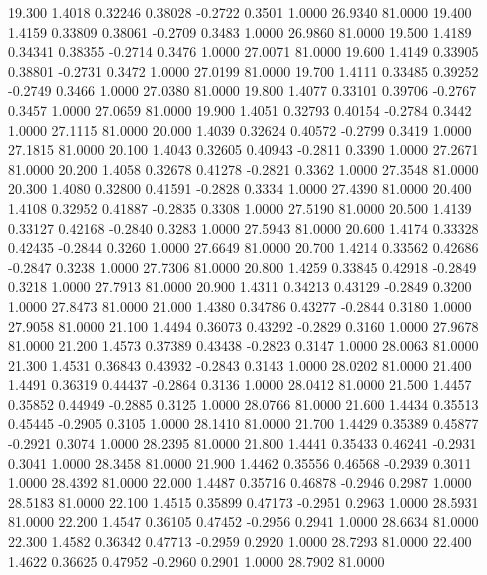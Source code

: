   19.300   1.4018   0.32246   0.38028  -0.2722   0.3501   1.0000  26.9340  81.0000
  19.400   1.4159   0.33809   0.38061  -0.2709   0.3483   1.0000  26.9860  81.0000
  19.500   1.4189   0.34341   0.38355  -0.2714   0.3476   1.0000  27.0071  81.0000
  19.600   1.4149   0.33905   0.38801  -0.2731   0.3472   1.0000  27.0199  81.0000
  19.700   1.4111   0.33485   0.39252  -0.2749   0.3466   1.0000  27.0380  81.0000
  19.800   1.4077   0.33101   0.39706  -0.2767   0.3457   1.0000  27.0659  81.0000
  19.900   1.4051   0.32793   0.40154  -0.2784   0.3442   1.0000  27.1115  81.0000
  20.000   1.4039   0.32624   0.40572  -0.2799   0.3419   1.0000  27.1815  81.0000
  20.100   1.4043   0.32605   0.40943  -0.2811   0.3390   1.0000  27.2671  81.0000
  20.200   1.4058   0.32678   0.41278  -0.2821   0.3362   1.0000  27.3548  81.0000
  20.300   1.4080   0.32800   0.41591  -0.2828   0.3334   1.0000  27.4390  81.0000
  20.400   1.4108   0.32952   0.41887  -0.2835   0.3308   1.0000  27.5190  81.0000
  20.500   1.4139   0.33127   0.42168  -0.2840   0.3283   1.0000  27.5943  81.0000
  20.600   1.4174   0.33328   0.42435  -0.2844   0.3260   1.0000  27.6649  81.0000
  20.700   1.4214   0.33562   0.42686  -0.2847   0.3238   1.0000  27.7306  81.0000
  20.800   1.4259   0.33845   0.42918  -0.2849   0.3218   1.0000  27.7913  81.0000
  20.900   1.4311   0.34213   0.43129  -0.2849   0.3200   1.0000  27.8473  81.0000
  21.000   1.4380   0.34786   0.43277  -0.2844   0.3180   1.0000  27.9058  81.0000
  21.100   1.4494   0.36073   0.43292  -0.2829   0.3160   1.0000  27.9678  81.0000
  21.200   1.4573   0.37389   0.43438  -0.2823   0.3147   1.0000  28.0063  81.0000
  21.300   1.4531   0.36843   0.43932  -0.2843   0.3143   1.0000  28.0202  81.0000
  21.400   1.4491   0.36319   0.44437  -0.2864   0.3136   1.0000  28.0412  81.0000
  21.500   1.4457   0.35852   0.44949  -0.2885   0.3125   1.0000  28.0766  81.0000
  21.600   1.4434   0.35513   0.45445  -0.2905   0.3105   1.0000  28.1410  81.0000
  21.700   1.4429   0.35389   0.45877  -0.2921   0.3074   1.0000  28.2395  81.0000
  21.800   1.4441   0.35433   0.46241  -0.2931   0.3041   1.0000  28.3458  81.0000
  21.900   1.4462   0.35556   0.46568  -0.2939   0.3011   1.0000  28.4392  81.0000
  22.000   1.4487   0.35716   0.46878  -0.2946   0.2987   1.0000  28.5183  81.0000
  22.100   1.4515   0.35899   0.47173  -0.2951   0.2963   1.0000  28.5931  81.0000
  22.200   1.4547   0.36105   0.47452  -0.2956   0.2941   1.0000  28.6634  81.0000
  22.300   1.4582   0.36342   0.47713  -0.2959   0.2920   1.0000  28.7293  81.0000
  22.400   1.4622   0.36625   0.47952  -0.2960   0.2901   1.0000  28.7902  81.0000
